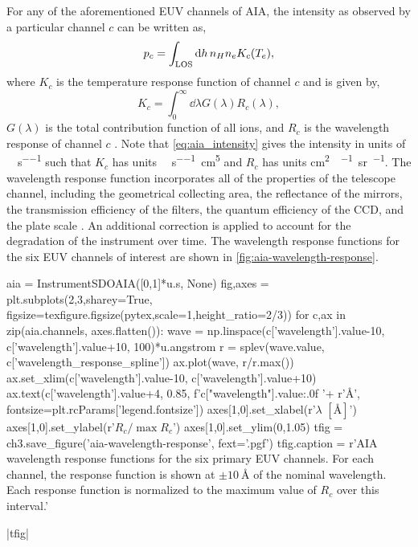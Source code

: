 For any of the aforementioned EUV channels of AIA, the intensity as observed by a particular channel $c$ can be written as,
\begin{equation}\label{eq:aia_intensity}
    p_c = \int_\textup{LOS}\textup{d}h\,n_Hn_eK_c(T_e),
\end{equation}
where $K_c$ is the temperature response function of channel $c$ and is given by,
\begin{equation}\label{eq:temperature_response}
    K_c = \int_0^\infty\dd{\lambda}G(\lambda)R_c(\lambda),
\end{equation}
$G(\lambda)$ is the total contribution function of all ions, and $R_c$ is the wavelength response of channel $c$ \citep{boerner_initial_2012}. Note that \autoref{eq:aia_intensity} gives the intensity in units of \si{\dn\per\pixel\per\second} such that $K_c$ has units \si{\dn\per\pixel\per\second\cm\tothe{5}} and $R_c$ has units \si{\cm\squared\dn\per\photon\steradian\per\pixel}. The wavelength response function incorporates all of the properties of the telescope channel, including the geometrical collecting area, the reflectance of the mirrors, the transmission efficiency of the filters, the quantum efficiency of the CCD, and the plate scale \citep[see Section 2 and Table 2 of][]{boerner_initial_2012}. An additional correction is applied to account for the degradation of the instrument over time. The wavelength response functions for the six EUV channels of interest are shown in \autoref{fig:aia-wavelength-response}.

\begin{pycode}[chapter3]
aia = InstrumentSDOAIA([0,1]*u.s, None)
fig,axes = plt.subplots(2,3,sharey=True,
                        figsize=texfigure.figsize(pytex,scale=1,height_ratio=2/3))
for c,ax in zip(aia.channels, axes.flatten()):
    wave = np.linspace(c['wavelength'].value-10, c['wavelength'].value+10, 100)*u.angstrom
    r = splev(wave.value, c['wavelength_response_spline'])
    ax.plot(wave, r/r.max())
    ax.set_xlim(c['wavelength'].value-10, c['wavelength'].value+10)
    ax.text(c['wavelength'].value+4, 0.85, f'{c["wavelength"].value:.0f} '+ r'$\si{\angstrom}$',
            fontsize=plt.rcParams['legend.fontsize'])
axes[1,0].set_xlabel(r'$\lambda$ $[\si{\angstrom}]$')
axes[1,0].set_ylabel(r'$R_c/\max{R_c}$')
axes[1,0].set_ylim(0,1.05)
tfig = ch3.save_figure('aia-wavelength-response', fext='.pgf')
tfig.caption = r'AIA wavelength response functions for the six primary EUV channels. For each channel, the response function is shown at $\pm\SI{10}{\angstrom}$ of the nominal wavelength. Each response function is normalized to the maximum value of $R_c$ over this interval.'
\end{pycode}
\py[chapter3]|tfig|

